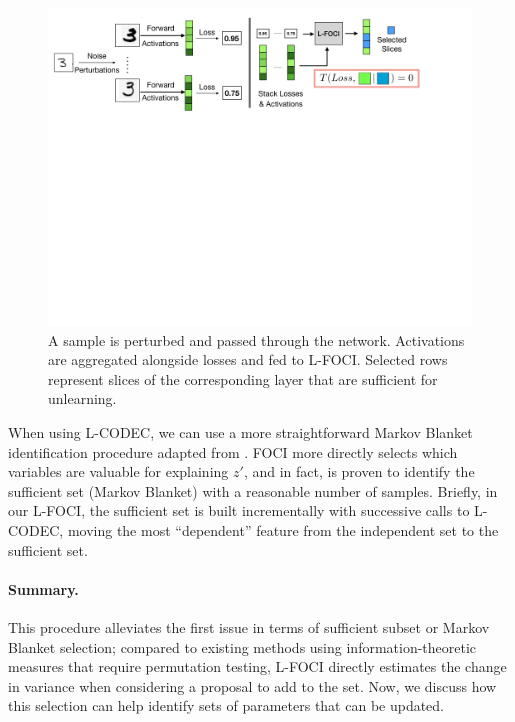 \begin{figure}
    \centering
    \includegraphics[width=\columnwidth,trim={0 18cm 4cm 0},clip]{5_unlearn/figs/foci_fig_new.png}
    \caption[L-FOCI subset identification pipeline]{A sample is perturbed and passed through the network. Activations are aggregated alongside losses and fed to L-FOCI. Selected rows represent slices of the corresponding layer that are sufficient for unlearning.}
    \label{fig:lfoci}
\end{figure}

When using L-CODEC, we can use a more straightforward Markov Blanket identification procedure adapted from \cite{codec}. FOCI more directly selects which variables are valuable for explaining $z'$, and in fact, is proven to identify the sufficient set (Markov Blanket) with a reasonable number of samples. Briefly, in our L-FOCI, the sufficient set is built incrementally with successive calls to L-CODEC, moving the most ``dependent'' feature from the independent set to the sufficient set.

\paragraph{Summary.} This procedure alleviates the first issue in terms of sufficient subset or Markov Blanket selection; compared to existing methods using information-theoretic measures that require permutation testing, L-FOCI directly estimates the change in variance when considering a proposal to add to the set.
Now, we discuss how this selection can help identify sets of parameters that can be updated.
